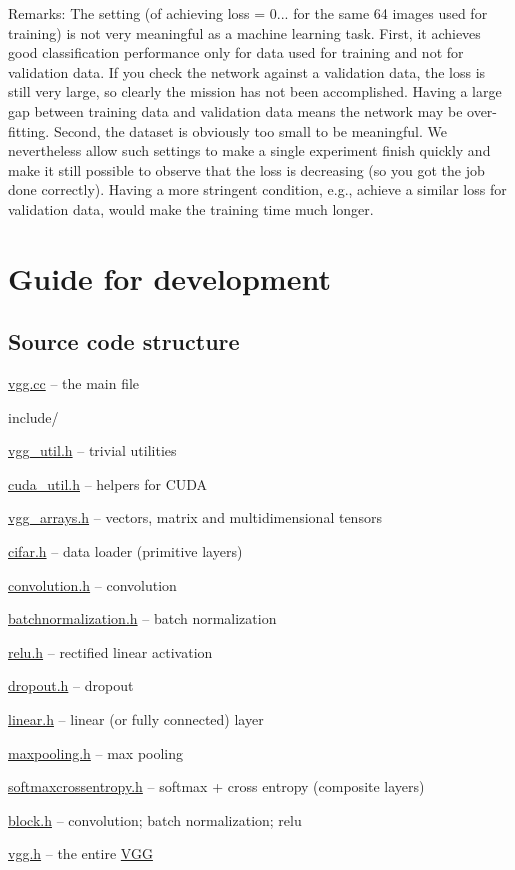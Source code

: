 Remarks\+: The setting (of achieving loss = 0... for the same 64 images used for training) is not very meaningful as a machine learning task. First, it achieves good classification performance only for data used for training and not for validation data. If you check the network against a validation data, the loss is still very large, so clearly the mission has not been accomplished. Having a large gap between training data and validation data means the network may be over-\/fitting. Second, the dataset is obviously too small to be meaningful. We nevertheless allow such settings to make a single experiment finish quickly and make it still possible to observe that the loss is decreasing (so you got the job done correctly). Having a more stringent condition, e.\+g., achieve a similar loss for validation data, would make the training time much longer.

\section*{Guide for development }

\subsection*{Source code structure }


\begin{DoxyItemize}
\item \hyperlink{vgg_8cc}{vgg.\+cc} -- the main file
\item include/
\begin{DoxyItemize}
\item \hyperlink{vgg__util_8h}{vgg\+\_\+util.\+h} -- trivial utilities
\item \hyperlink{cuda__util_8h}{cuda\+\_\+util.\+h} -- helpers for C\+U\+DA
\item \hyperlink{vgg__arrays_8h}{vgg\+\_\+arrays.\+h} -- vectors, matrix and multidimensional tensors
\item \hyperlink{cifar_8h}{cifar.\+h} -- data loader (primitive layers)
\item \hyperlink{convolution_8h}{convolution.\+h} -- convolution
\item \hyperlink{batchnormalization_8h}{batchnormalization.\+h} -- batch normalization
\item \hyperlink{relu_8h}{relu.\+h} -- rectified linear activation
\item \hyperlink{dropout_8h}{dropout.\+h} -- dropout
\item \hyperlink{linear_8h}{linear.\+h} -- linear (or fully connected) layer
\item \hyperlink{maxpooling_8h}{maxpooling.\+h} -- max pooling
\item \hyperlink{softmaxcrossentropy_8h}{softmaxcrossentropy.\+h} -- softmax + cross entropy (composite layers)
\item \hyperlink{block_8h}{block.\+h} -- convolution; batch normalization; relu
\item \hyperlink{vgg_8h}{vgg.\+h} -- the entire \hyperlink{structVGG}{V\+GG}
\end{DoxyItemize}
\end{DoxyItemize}

